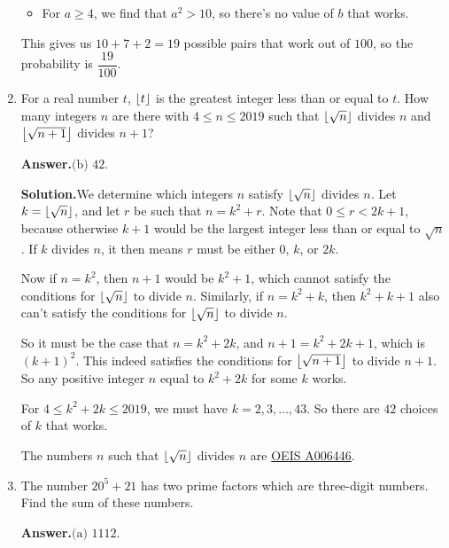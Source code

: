 \documentclass[11pt,paper=letter]{scrartcl}
\newcommand{\ans}{{\sffamily \bfseries Answer.}\;}
\newcommand{\sol}{{\sffamily \bfseries Solution.}\;}
\newcommand{\rem}[1]{{\small \sffamily \sansmath {\bfseries Remark.} #1}}
\begin{document}
\begin{enumerate}[align=left,leftmargin=*,resume]
\begin{itemize}[itemsep=-0.7ex]
  \item For $a \ge 4$, we find that $a^2 > 10$, so there's no value of $b$ that works.
\end{itemize}

This gives us $10 + 7 + 2 = 19$ possible pairs that work out of $100$, so the probability is $\dfrac{19}{100}$.

\item For a real number $t$, $\left\lfloor t \right\rfloor$ is the greatest integer less than or equal to $t$. How many integers $n$ are there with $4 \le n \le 2019$ such that $\left\lfloor \sqrt{n} \right\rfloor$ divides $n$ and $\left\lfloor \sqrt{n+1} \right\rfloor$ divides $n+1$?


\ans $\boxed{\text{(b) }42}$.

\sol We determine which integers $n$ satisfy $\left\lfloor \sqrt{n} \right\rfloor$ divides $n$. Let $k = \left\lfloor \sqrt{n} \right\rfloor$, and let $r$ be such that $n = k^2 + r$. Note that $0 \le r < 2k + 1$, because otherwise $k + 1$ would be the largest integer less than or equal to $\sqrt{n}$. If $k$ divides $n$, it then means $r$ must be either $0$, $k$, or $2k$.

Now if $n = k^2$, then $n + 1$ would be $k^2 + 1$, which cannot satisfy the conditions for $\left\lfloor \sqrt{n} \right\rfloor$ to divide $n$. Similarly, if $n = k^2 + k$, then $k^2 + k + 1$ also can't satisfy the conditions for $\left\lfloor \sqrt{n} \right\rfloor$ to divide $n$.

So it must be the case that $n = k^2 + 2k$, and $n + 1 = k^2 + 2k + 1$, which is $(k + 1)^2$. This indeed satisfies the conditions for $\left\lfloor \sqrt{n+1} \right\rfloor$ to divide $n+1$. So any positive integer $n$ equal to $k^2 + 2k$ for some $k$ works.

For $4 \le k^2 + 2k \le 2019$, we must have $k = 2, 3, \ldots, 43$. So there are $42$ choices of $k$ that works.

\rem{The numbers $n$ such that $\left\lfloor \sqrt{n} \right\rfloor$ divides $n$ are \href{https://oeis.org/A006446}{OEIS A006446{}}.}

\item The number $20^5 + 21$ has two prime factors which are three-digit numbers. Find the sum of these numbers.


\ans $\boxed{\text{(a) }1112}$.


\end{enumerate}
\end{document}
